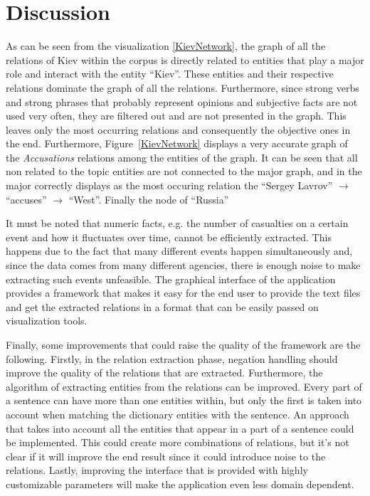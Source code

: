 \documentclass[]{article}
\begin{document}
\section{Discussion}
%
As can be seen from the visualization \ref{KievNetwork}, the graph of all the relations of Kiev within the corpus is directly related to entities that play a major role and interact with the entity ``Kiev''. These entities and their respective relations dominate the graph of all the relations. Furthermore, since strong verbs and strong phrases that probably represent opinions and subjective facts are not used very often, they are filtered out and are not presented in the graph. This leaves only the most occurring relations and consequently the objective ones in the end. Furthermore, Figure~\ref{KievNetwork} displays a very accurate graph of the \textit{Accusations} relations among the entities of the graph. It can be seen that all non related to the topic entities are not connected to the major graph, and in the major correctly displays as the most occuring relation the ``Sergey Lavrov'' $\to$ ``accuses'' $\to$  ``West''. Finally the node of ``Russia''

It must be noted that numeric facts, e.g. the number of casualties on a certain event and how it fluctuates over time, cannot be efficiently extracted. This happens due to the fact that many different events happen simultaneously and, since the data comes from many different agencies, there is enough noise to make extracting such events unfeasible. The graphical interface of the application provides a framework that makes it easy for the end user to provide the text files and get the extracted relations in a format that can be easily passed on visualization tools. 

Finally, some improvements that could raise the quality of the framework are the following. Firstly, in the relation extraction phase, negation handling  should improve the quality of the relations that are extracted. Furthermore, the algorithm of extracting entities from the relations can be improved. Every part of a sentence can have more than one entities within, but only the first is taken into account when matching the dictionary entities with the sentence. An approach that takes into account all the entities that appear in a part of a sentence could be implemented. This could create more combinations of relations, but it's not clear if it will improve the end result since it could introduce noise to the relations. Lastly, improving the interface that is provided with highly customizable parameters will make the application even less domain dependent.
%
\end{document}
